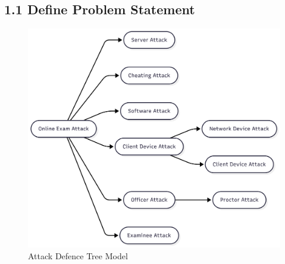 \subsection{1.1 Define Problem Statement}
 \begin{figure}[H] 
	     \centering%
	     \includegraphics[width=12cm]{figure/atk-def-online-exam.png}
	     \caption{Attack Defence Tree Model \citet{rosmansyah2019attackdefensetreeonaeexamsystem}}
     \label{fig:attack-defend-tree-model}
 \end{figure}

